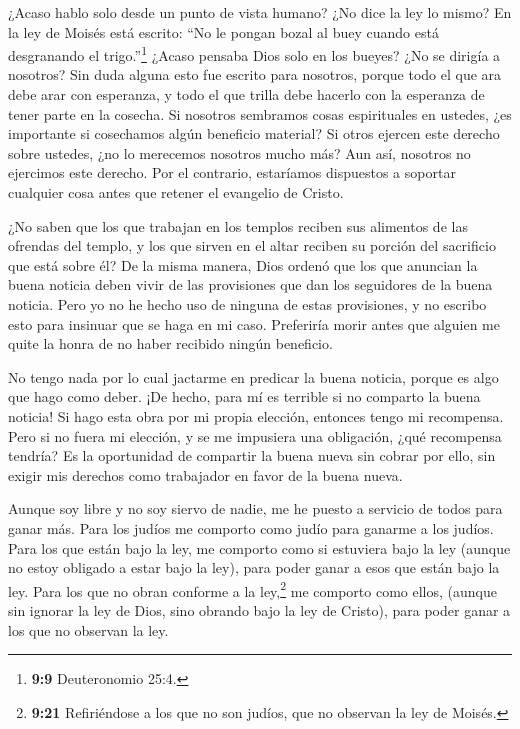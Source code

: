  ¿Acaso hablo solo desde un punto de vista humano? ¿No dice
la ley lo mismo?  En la ley de Moisés está escrito: ``No le
pongan bozal al buey cuando está desgranando el trigo.''\footnote{\textbf{9:9}
  Deuteronomio 25:4.} ¿Acaso pensaba Dios solo en los bueyes?
 ¿No se dirigía a nosotros? Sin duda alguna esto fue
escrito para nosotros, porque todo el que ara debe arar con esperanza, y
todo el que trilla debe hacerlo con la esperanza de tener parte en la
cosecha.  Si nosotros sembramos cosas espirituales en
ustedes, ¿es importante si cosechamos algún beneficio material?
 Si otros ejercen este derecho sobre ustedes, ¿no lo
merecemos nosotros mucho más? Aun así, nosotros no ejercimos este
derecho. Por el contrario, estaríamos dispuestos a soportar cualquier
cosa antes que retener el evangelio de Cristo.

 ¿No saben que los que trabajan en los templos reciben sus
alimentos de las ofrendas del templo, y los que sirven en el altar
reciben su porción del sacrificio que está sobre él?  De la
misma manera, Dios ordenó que los que anuncian la buena noticia deben
vivir de las provisiones que dan los seguidores de la buena noticia.
 Pero yo no he hecho uso de ninguna de estas provisiones, y
no escribo esto para insinuar que se haga en mi caso. Preferiría morir
antes que alguien me quite la honra de no haber recibido ningún
beneficio.

 No tengo nada por lo cual jactarme en predicar la buena
noticia, porque es algo que hago como deber. ¡De hecho, para mí es
terrible si no comparto la buena noticia!  Si hago esta
obra por mi propia elección, entonces tengo mi recompensa. Pero si no
fuera mi elección, y se me impusiera una obligación,  ¿qué
recompensa tendría? Es la oportunidad de compartir la buena nueva sin
cobrar por ello, sin exigir mis derechos como trabajador en favor de la
buena nueva.

 Aunque soy libre y no soy siervo de nadie, me he puesto a
servicio de todos para ganar más.  Para los judíos me
comporto como judío para ganarme a los judíos. Para los que están bajo
la ley, me comporto como si estuviera bajo la ley (aunque no estoy
obligado a estar bajo la ley), para poder ganar a esos que están bajo la
ley.  Para los que no obran conforme a la ley,\footnote{\textbf{9:21}
  Refiriéndose a los que no son judíos, que no observan la ley de
  Moisés.} me comporto como ellos, (aunque sin ignorar la ley de Dios,
sino obrando bajo la ley de Cristo), para poder ganar a los que no
observan la ley.

